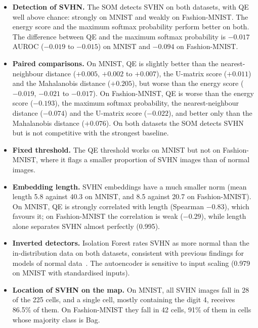 \documentclass{scrartcl}
\begin{document}
\begin{itemize}
  \item \textbf{Detection of SVHN.} The SOM detects SVHN on both datasets, with QE well above chance: strongly on MNIST and weakly on Fashion-MNIST. The energy score and the maximum softmax probability perform better on both. The difference between QE and the maximum softmax probability is $-0.017$ AUROC ($-0.019$ to $-0.015$) on MNIST and $-0.094$ on Fashion-MNIST.
  \item \textbf{Paired comparisons.} On MNIST, QE is slightly better than the nearest-neighbour distance ($+0.005$, $+0.002$ to $+0.007$), the U-matrix score ($+0.011$) and the Mahalanobis distance ($+0.205$), but worse than the energy score ($-0.019$, $-0.021$ to $-0.017$). On Fashion-MNIST, QE is worse than the energy score ($-0.193$), the maximum softmax probability, the nearest-neighbour distance ($-0.074$) and the U-matrix score ($-0.022$), and better only than the Mahalanobis distance ($+0.076$). On both datasets the SOM detects SVHN but is not competitive with the strongest baseline.
  \item \textbf{Fixed threshold.} The QE threshold works on MNIST but not on Fashion-MNIST, where it flags a smaller proportion of SVHN images than of normal images.
  \item \textbf{Embedding length.} SVHN embeddings have a much smaller norm (mean length 5.8 against 40.3 on MNIST, and 8.5 against 20.7 on Fashion-MNIST). On MNIST, QE is strongly correlated with length (Spearman $-0.83$), which favours it; on Fashion-MNIST the correlation is weak ($-0.29$), while length alone separates SVHN almost perfectly (0.995).
  \item \textbf{Inverted detectors.} Isolation Forest rates SVHN as more normal than the in-distribution data on both datasets, consistent with previous findings for models of normal data~\cite{nalisnick2019deep}. The autoencoder is sensitive to input scaling (0.979 on MNIST with standardised inputs).
  \item \textbf{Location of SVHN on the map.} On MNIST, all SVHN images fall in 28 of the 225 cells, and a single cell, mostly containing the digit 4, receives 86.5\% of them. On Fashion-MNIST they fall in 42 cells, 91\% of them in cells whose majority class is Bag.
\end{itemize}
\end{document}
